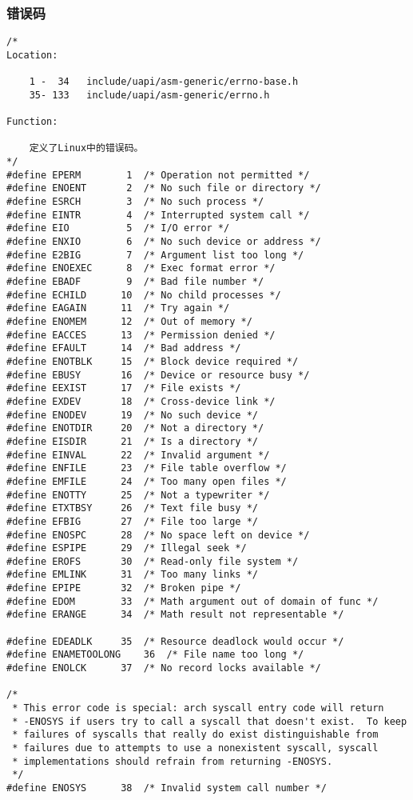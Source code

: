 			\subsubsection{错误码}
\begin{verbatim}
/*
Location:

	1 -  34   include/uapi/asm-generic/errno-base.h
	35- 133	  include/uapi/asm-generic/errno.h

Function:

	定义了Linux中的错误码。
*/
#define	EPERM		 1	/* Operation not permitted */
#define	ENOENT		 2	/* No such file or directory */
#define	ESRCH		 3	/* No such process */
#define	EINTR		 4	/* Interrupted system call */
#define	EIO		 	 5	/* I/O error */
#define	ENXIO		 6	/* No such device or address */
#define	E2BIG		 7	/* Argument list too long */
#define	ENOEXEC		 8	/* Exec format error */
#define	EBADF		 9	/* Bad file number */
#define	ECHILD		10	/* No child processes */
#define	EAGAIN		11	/* Try again */
#define	ENOMEM		12	/* Out of memory */
#define	EACCES		13	/* Permission denied */
#define	EFAULT		14	/* Bad address */
#define	ENOTBLK		15	/* Block device required */
#define	EBUSY		16	/* Device or resource busy */
#define	EEXIST		17	/* File exists */
#define	EXDEV		18	/* Cross-device link */
#define	ENODEV		19	/* No such device */
#define	ENOTDIR		20	/* Not a directory */
#define	EISDIR		21	/* Is a directory */
#define	EINVAL		22	/* Invalid argument */
#define	ENFILE		23	/* File table overflow */
#define	EMFILE		24	/* Too many open files */
#define	ENOTTY		25	/* Not a typewriter */
#define	ETXTBSY		26	/* Text file busy */
#define	EFBIG		27	/* File too large */
#define	ENOSPC		28	/* No space left on device */
#define	ESPIPE		29	/* Illegal seek */
#define	EROFS		30	/* Read-only file system */
#define	EMLINK		31	/* Too many links */
#define	EPIPE		32	/* Broken pipe */
#define	EDOM		33	/* Math argument out of domain of func */
#define	ERANGE		34	/* Math result not representable */

#define	EDEADLK		35	/* Resource deadlock would occur */
#define	ENAMETOOLONG	36	/* File name too long */
#define	ENOLCK		37	/* No record locks available */

/*
 * This error code is special: arch syscall entry code will return
 * -ENOSYS if users try to call a syscall that doesn't exist.  To keep
 * failures of syscalls that really do exist distinguishable from
 * failures due to attempts to use a nonexistent syscall, syscall
 * implementations should refrain from returning -ENOSYS.
 */
#define	ENOSYS		38	/* Invalid system call number */


\end{verbatim}
